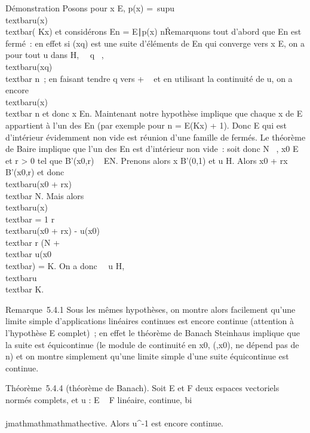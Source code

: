 Démonstration Posons pour x \in E, p(x) =\
supu\inH\\textbar{}u(x)\\textbar{}(\leq
Kx) et considérons En = \x \in
E∣p(x) \leq n\. Remarquons tout
d'abord que En est fermé~: en effet si (xq) est une
suite d'éléments de En qui converge vers x \in E, on a pour tout
u dans H, \forall~~q \in \mathbb{N}~,
\\textbar{}u(xq)\\textbar{} \leq
n~; en faisant tendre q vers + \infty~ et en utilisant la continuité de u, on
a encore \\textbar{}u(x)\\textbar{} \leq n et
donc x \in En. Maintenant notre hypothèse implique que chaque x
de E appartient à l'un des En (par exemple pour n =
E(Kx) + 1). Donc E qui est d'intérieur évidemment non vide est
réunion d'une famille de fermés. Le théorème de Baire implique que l'un
des En est d'intérieur non vide~: soit donc N \in \mathbb{N}~,
x0 \in E et r \textgreater{} 0 tel que B'(x0,r) \subset~
EN. Prenons alors x \in B'(0,1) et u \in H. Alors x0 +
rx \in B'(x0,r) et donc \\textbar{}u(x0
+ rx)\\textbar{} \leq N. Mais alors
\\textbar{}u(x)\\textbar{} = 1
\over r \\textbar{}u(x0 + rx)
- u(x0)\\textbar{}  \over
r (N +\\textbar{}
u(x0\\textbar{}) = K. On a donc
\forall~~u \in H,
\\textbar{}u\\textbar{} \leq K.

Remarque~5.4.1 Sous les mêmes hypothèses, on montre alors facilement
qu'une limite simple d'applications linéaires continues est encore
continue (attention à l'hypothèse E complet)~; en effet le théorème de
Banach Steinhaus implique que la suite est équicontinue (le module de
continuité en x0, \eta(\epsilon,x0), ne dépend pas de n) et on
montre simplement qu'une limite simple d'une suite équicontinue est
continue.

Théorème~5.4.4 (théorème de Banach). Soit E et F deux espaces vectoriels
normés complets, et u : E \rightarrow~ F linéaire, continue, bi\\\\jmathmathmathmathective. Alors
u^-1 est encore continue.

